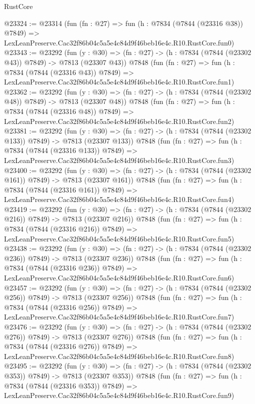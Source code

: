 \begin{lexlean}{RustCore}
\begin{coremodule}
@23324 := @23314
    (fun (fn : @27) =>
    fun (h : @7834 (@7844 (@23316 @38)) @7849) =>
    LexLeanPreserve.Cac32f86b04c5a5e4c84d9f46beb16e4c.R10.RustCore.fun0)
@23343 := @23292
    (fun (y : @30) => (fn : @27) -> (h : @7834 (@7844 (@23302 @43)) @7849) -> @7813 (@23307 @43))
    @7848
    (fun (fn : @27) =>
    fun (h : @7834 (@7844 (@23316 @43)) @7849) =>
    LexLeanPreserve.Cac32f86b04c5a5e4c84d9f46beb16e4c.R10.RustCore.fun1)
@23362 := @23292
    (fun (y : @30) => (fn : @27) -> (h : @7834 (@7844 (@23302 @48)) @7849) -> @7813 (@23307 @48))
    @7848
    (fun (fn : @27) =>
    fun (h : @7834 (@7844 (@23316 @48)) @7849) =>
    LexLeanPreserve.Cac32f86b04c5a5e4c84d9f46beb16e4c.R10.RustCore.fun2)
@23381 := @23292
    (fun (y : @30) => (fn : @27) -> (h : @7834 (@7844 (@23302 @133)) @7849) -> @7813 (@23307 @133))
    @7848
    (fun (fn : @27) =>
    fun (h : @7834 (@7844 (@23316 @133)) @7849) =>
    LexLeanPreserve.Cac32f86b04c5a5e4c84d9f46beb16e4c.R10.RustCore.fun3)
@23400 := @23292
    (fun (y : @30) => (fn : @27) -> (h : @7834 (@7844 (@23302 @161)) @7849) -> @7813 (@23307 @161))
    @7848
    (fun (fn : @27) =>
    fun (h : @7834 (@7844 (@23316 @161)) @7849) =>
    LexLeanPreserve.Cac32f86b04c5a5e4c84d9f46beb16e4c.R10.RustCore.fun4)
@23419 := @23292
    (fun (y : @30) => (fn : @27) -> (h : @7834 (@7844 (@23302 @216)) @7849) -> @7813 (@23307 @216))
    @7848
    (fun (fn : @27) =>
    fun (h : @7834 (@7844 (@23316 @216)) @7849) =>
    LexLeanPreserve.Cac32f86b04c5a5e4c84d9f46beb16e4c.R10.RustCore.fun5)
@23438 := @23292
    (fun (y : @30) => (fn : @27) -> (h : @7834 (@7844 (@23302 @236)) @7849) -> @7813 (@23307 @236))
    @7848
    (fun (fn : @27) =>
    fun (h : @7834 (@7844 (@23316 @236)) @7849) =>
    LexLeanPreserve.Cac32f86b04c5a5e4c84d9f46beb16e4c.R10.RustCore.fun6)
@23457 := @23292
    (fun (y : @30) => (fn : @27) -> (h : @7834 (@7844 (@23302 @256)) @7849) -> @7813 (@23307 @256))
    @7848
    (fun (fn : @27) =>
    fun (h : @7834 (@7844 (@23316 @256)) @7849) =>
    LexLeanPreserve.Cac32f86b04c5a5e4c84d9f46beb16e4c.R10.RustCore.fun7)
@23476 := @23292
    (fun (y : @30) => (fn : @27) -> (h : @7834 (@7844 (@23302 @276)) @7849) -> @7813 (@23307 @276))
    @7848
    (fun (fn : @27) =>
    fun (h : @7834 (@7844 (@23316 @276)) @7849) =>
    LexLeanPreserve.Cac32f86b04c5a5e4c84d9f46beb16e4c.R10.RustCore.fun8)
@23495 := @23292
    (fun (y : @30) => (fn : @27) -> (h : @7834 (@7844 (@23302 @353)) @7849) -> @7813 (@23307 @353))
    @7848
    (fun (fn : @27) =>
    fun (h : @7834 (@7844 (@23316 @353)) @7849) =>
    LexLeanPreserve.Cac32f86b04c5a5e4c84d9f46beb16e4c.R10.RustCore.fun9)

\end{coremodule}
\end{lexlean}
